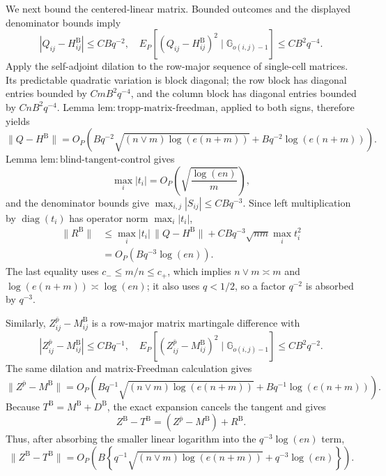 We next bound the centered-linear matrix.  Bounded outcomes and the displayed denominator bounds imply
\[
 |Q_{ij}-H^{\mathrm B}_{ij}|\le C Bq^{-2},
 \quad
 E_P[(Q_{ij}-H^{\mathrm B}_{ij})^2
       \mid\mathbb G_{o(i,j)-1}]\le C B^2q^{-4}.
\]
Apply the self-adjoint dilation to the row-major sequence of single-cell matrices.  Its predictable quadratic variation is block diagonal; the row block has diagonal entries bounded by \(CmB^2q^{-4}\), and the column block has diagonal entries bounded by \(CnB^2q^{-4}\).  Lemma \(\mathrm{lem:tropp\mbox{-}matrix\mbox{-}freedman}\), applied to both signs, therefore yields
\[
 \lVert Q-H^{\mathrm B}\rVert
 =O_P\!\left(
 Bq^{-2}\sqrt{(n\vee m)\log(e(n+m))}
 +Bq^{-2}\log(e(n+m))
 \right).
\]
Lemma \(\mathrm{lem:blind\mbox{-}tangent\mbox{-}control}\) gives
\[
 \max_i|t_i|=O_P\!\left(\sqrt{\frac{\log(en)}m}\right),
\]
and the denominator bounds give \(\max_{i,j}|S_{ij}|\le CBq^{-3}\).  Since left multiplication by \(\operatorname{diag}(t_i)\) has operator norm \(\max_i|t_i|\),
\[
 \begin{aligned}
 \lVert R^{\mathrm B}\rVert
 &\le \max_i|t_i|\,\lVert Q-H^{\mathrm B}\rVert
 +CBq^{-3}\sqrt{nm}\max_i t_i^2\\
 &=O_P(Bq^{-3}\log(en)).
 \end{aligned}
\]
The last equality uses \(c_-\le m/n\le c_+\), which implies \(n\vee m\asymp m\) and \(\log(e(n+m))\asymp\log(en)\); it also uses \(q<1/2\), so a factor \(q^{-2}\) is absorbed by \(q^{-3}\).

Similarly, \(Z^{\bar p}_{ij}-M^{\mathrm B}_{ij}\) is a row-major matrix martingale difference with
\[
 |Z^{\bar p}_{ij}-M^{\mathrm B}_{ij}|\le CBq^{-1},
 \quad
 E_P[(Z^{\bar p}_{ij}-M^{\mathrm B}_{ij})^2
       \mid\mathbb G_{o(i,j)-1}]\le CB^2q^{-2}.
\]
The same dilation and matrix-Freedman calculation gives
\[
 \lVert Z^{\bar p}-M^{\mathrm B}\rVert
 =O_P\!\left(
 Bq^{-1}\sqrt{(n\vee m)\log(e(n+m))}
 +Bq^{-1}\log(e(n+m))
 \right).
\]
Because \(T^{\mathrm B}=M^{\mathrm B}+D^{\mathrm B}\), the exact expansion cancels the tangent and gives
\[
 Z^{\mathrm B}-T^{\mathrm B}
 =(Z^{\bar p}-M^{\mathrm B})+R^{\mathrm B}.
\]
Thus, after absorbing the smaller linear logarithm into the \(q^{-3}\log(en)\) term,
\[
 \lVert Z^{\mathrm B}-T^{\mathrm B}\rVert
 =O_P\!\left(B\left\{
 q^{-1}\sqrt{(n\vee m)\log(e(n+m))}
 +q^{-3}\log(en)\right\}\right).
\]

